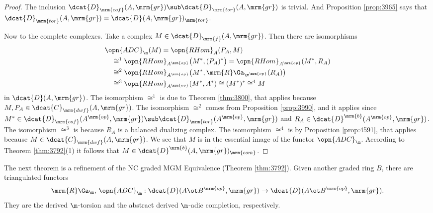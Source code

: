 \begin{proof}
The inclusion 
$\dcat{D}_{\mrm{cof}}^{}(A, \mrm{gr}) \sub
\dcat{D}^{}_{\mrm{tor}}(A, \mrm{gr})$
is trivial. And Proposition \ref{prop:3965} says that 
$\dcat{D}^{}_{\mrm{tor}}(A, \mrm{gr}) = 
\dcat{D}^{}(A, \mrm{gr})_{\mrm{tor}}$.

Now to the complete complexes. 
Take a complex 
$M \in \dcat{D}^{}_{\mrm{f}}(A, \mrm{gr})$.
Then there are isomorphisms 
\begin{equation} \label{eqn:4025}
\begin{aligned}
& \opn{ADC}_{\m}(M) = \opn{RHom}_{A}(P_A, M) 
\\ & \quad
\cong^1 \opn{RHom}_{A^{\mrm{op}}} \bigl( M^*, (P_A)^* \bigr) 
= \opn{RHom}_{A^{\mrm{op}}}(M^*, R_A) 
\\ & \quad
\cong^2 \opn{RHom}_{A^{\mrm{op}}} \bigl( M^*, \mrm{R} \Ga_{\m^{\mrm{op}}}(R_A) 
\bigr) 
\\ & \quad
\cong^3 \opn{RHom}_{A^{\mrm{op}}}(M^*, A^*) 
\cong (M^*)^* \cong^4 M
\end{aligned} 
\end{equation}
in $\dcat{D}(A, \mrm{gr})$. 
The isomorphism $\cong^1$ is due to Theorem \ref{thm:3800}, that applies 
because $M, P_A \in \dcat{C}_{\mrm{dwf}}(A, \mrm{gr})$. 
The isomorphism $\cong^2$ comes from Proposition \ref{prop:3990}, and it 
applies since 
$M^* \in \dcat{D}^{}_{\mrm{cof}}(A^{\mrm{op}}, \mrm{gr}) \sub 
\dcat{D}^{}_{\mrm{tor}}(A^{\mrm{op}}, \mrm{gr})$
and 
$R_A \in \dcat{D}^{\mrm{b}}(A^{\mrm{op}}, \mrm{gr})$. 
The isomorphism $\cong^3$ is because $R_A$ is a balanced dualizing complex.  
The isomorphism $\cong^4$ is by Proposition \ref{prop:4591}, that applies 
because $M \in \dcat{C}_{\mrm{dwf}}(A, \mrm{gr})$. 
We see that $M$ is in the essential image of the functor $\opn{ADC}_{\m}$. 
According to Theorem \ref{thm:3792}(1) it follows that 
$M \in \dcat{D}^{\mrm{b}}(A, \mrm{gr})_{\mrm{com}}$. 
\end{proof}

The next theorem is a refinement of the NC graded MGM Equivalence (Theorem 
\ref{thm:3792}). Given another graded ring $B$, there are triangulated functors 
\[ \mrm{R} \Ga_{\m}, \, \opn{ADC}_{\m} : 
\dcat{D}(A \ot B^{\mrm{op}}, \mrm{gr}) \to 
\dcat{D}(A \ot B^{\mrm{op}}, \mrm{gr}) . \]
They are the derived $\m$-torsion and the abstract derived $\m$-adic 
completion, respectively. 

